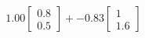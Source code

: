 \documentclass[preview]{standalone}
\begin{document}
\begin{align*}
1.00 \begin{bmatrix} 0.8 \\ 0.5 \end{bmatrix} + -0.83 \begin{bmatrix} 1 \\ 1.6 \end{bmatrix}
\end{align*}
\end{document}
